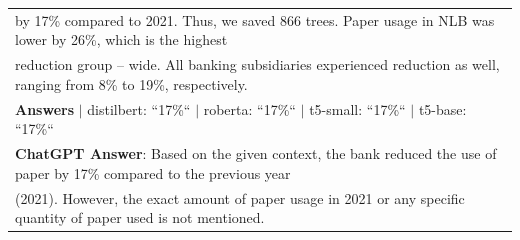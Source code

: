 \documentclass[fleqn,moreauthors,10pt]{ds_report}
\begin{document}
\begin{table}[hbt]
{\begin{tabular}{l}
        by 17\% compared to 2021. Thus, we saved 866 trees. Paper usage in NLB was lower by 26\%, which is the highest\\
        reduction group – wide. All banking subsidiaries experienced reduction as well, ranging from 8\% to 19\%, respectively.\\
        \hline
		\textbf{Answers} $\mid$ distilbert: ``17\%`` $\mid$ roberta: ``17\%`` $\mid$ t5-small: ``17\%`` $\mid$ t5-base: ``17\%``\\
        \hline
        \textbf{ChatGPT Answer}: Based on the given context, the bank reduced the use of paper by 17\% compared to the previous year\\
        (2021). However, the exact amount of paper usage in 2021 or any specific quantity of paper used is not mentioned.\\
        \hline \hline
        
	\end{tabular}
    }
\end{table}
\end{document}
